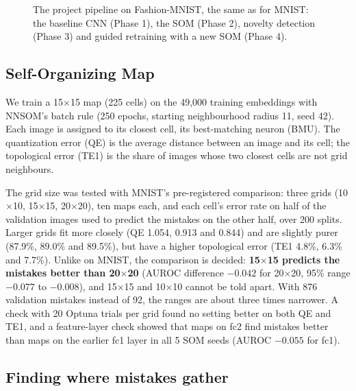 \documentclass[11pt]{article}
\begin{document}
\begin{figure}[H]
\caption{The project pipeline on Fashion-MNIST, the same as for MNIST: the baseline CNN (Phase 1), the SOM (Phase 2), novelty detection (Phase 3) and guided retraining with a new SOM (Phase 4).}
\label{fig:pipeline}
\end{figure}

\subsection{Self-Organizing Map}

We train a 15$\times$15 map (225 cells) on the 49,000 training embeddings with NNSOM's batch rule (250 epochs, starting neighbourhood radius 11, seed 42). Each image is assigned to its closest cell, its best-matching neuron (BMU).
The quantization error (QE) is the average distance between an image and its cell; the topological error (TE1) is the share of images whose two closest cells are not grid neighbours.

The grid size was tested with MNIST's pre-registered comparison: three grids (10$\times$10, 15$\times$15, 20$\times$20), ten maps each, and each cell's error rate on half of the validation images used to predict the mistakes on the other half, over 200 splits.
Larger grids fit more closely (QE 1.054, 0.913 and 0.844) and are slightly purer (87.9\%, 89.0\% and 89.5\%), but have a higher topological error (TE1 4.8\%, 6.3\% and 7.7\%).
Unlike on MNIST, the comparison is decided: \textbf{15$\times$15 predicts the mistakes better than 20$\times$20} (AUROC difference $-0.042$ for 20$\times$20, 95\% range $-0.077$ to $-0.008$), and 15$\times$15 and 10$\times$10 cannot be told apart. With 876 validation mistakes instead of 92, the ranges are about three times narrower.
A check with 20 Optuna \parencite{akiba2019optuna} trials per grid found no setting better on both QE and TE1, and a feature-layer check showed that maps on fc2 find mistakes better than maps on the earlier fc1 layer in all 5 SOM seeds (AUROC $-0.055$ for fc1).

\subsection{Finding where mistakes gather}
\end{document}
